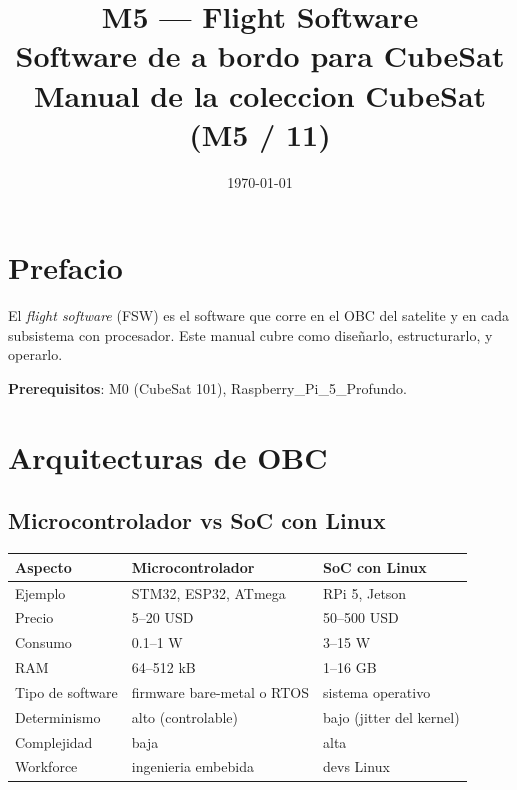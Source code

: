 \documentclass[11pt,a4paper,oneside,openright]{book}
\title{\Huge\bfseries M5 --- Flight Software\\[0.4em]
\Large Software de a bordo para CubeSat\\[0.6em]
\large Manual de la coleccion CubeSat (M5 / 11)}
\date{\today}
\begin{document}
\frontmatter
\maketitle

\chapter*{Prefacio}

El \emph{flight software} (FSW) es el software que corre en el OBC del
satelite y en cada subsistema con procesador. Este manual cubre como
diseñarlo, estructurarlo, y operarlo.

\textbf{Prerequisitos}: M0 (CubeSat 101), Raspberry\_Pi\_5\_Profundo.

\tableofcontents

\mainmatter

\chapter{Arquitecturas de OBC}

\section{Microcontrolador vs SoC con Linux}

\begin{center}
\begin{tabular}{p{4cm}p{5cm}p{5cm}}
\toprule
\textbf{Aspecto} & \textbf{Microcontrolador} & \textbf{SoC con Linux} \\
\midrule
Ejemplo            & STM32, ESP32, ATmega       & RPi 5, Jetson \\
Precio             & 5--20 USD                   & 50--500 USD \\
Consumo            & 0.1--1 W                    & 3--15 W \\
RAM                & 64--512 kB                  & 1--16 GB \\
Tipo de software   & firmware bare-metal o RTOS  & sistema operativo \\
Determinismo       & alto (controlable)          & bajo (jitter del kernel) \\
Complejidad        & baja                        & alta \\
Workforce          & ingenieria embebida         & devs Linux \\
\bottomrule
\end{tabular}
\end{center}
\end{document}
